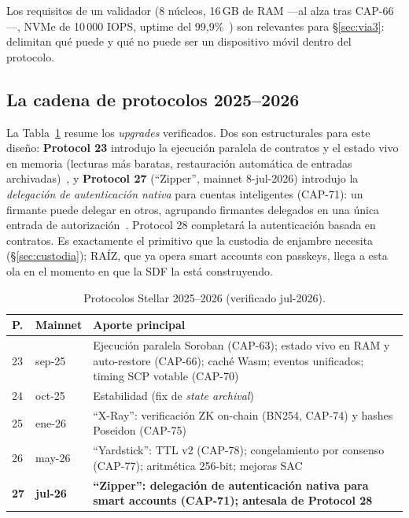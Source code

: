 \documentclass[twocolumn,10pt]{article}
\begin{document}
Los requisitos de un validador (8 n\'ucleos, 16\,GB de RAM ---al alza tras CAP-66---, NVMe de 10\,000 IOPS, uptime del 99{,}9\%~\cite{prereq}) son relevantes para \S\ref{sec:via3}: delimitan qu\'e puede y qu\'e no puede ser un dispositivo m\'ovil dentro del protocolo.

\subsection{La cadena de protocolos 2025--2026}

La Tabla~\ref{tab:protocolos} resume los \emph{upgrades} verificados. Dos son estructurales para este dise\~no: \textbf{Protocol 23} introdujo la ejecuci\'on paralela de contratos y el estado vivo en memoria (lecturas m\'as baratas, restauraci\'on autom\'atica de entradas archivadas)~\cite{p23}, y \textbf{Protocol 27} (``Zipper'', mainnet 8-jul-2026) introdujo la \emph{delegaci\'on de autenticaci\'on nativa} para cuentas inteligentes (CAP-71): un firmante puede delegar en otros, agrupando firmantes delegados en una \'unica entrada de autorizaci\'on~\cite{p27}. Protocol 28 completar\'a la autenticaci\'on basada en contratos. Es exactamente el primitivo que la custodia de enjambre necesita (\S\ref{sec:custodia}); RA\'IZ, que ya opera smart accounts con passkeys, llega a esta ola en el momento en que la SDF la est\'a construyendo.

\begin{table}[t]
\centering\small
\caption{Protocolos Stellar 2025--2026 (verificado jul-2026).}
\label{tab:protocolos}
\begin{tabularx}{\columnwidth}{@{}llX@{}}
\toprule
\textbf{P.} & \textbf{Mainnet} & \textbf{Aporte principal} \\
\midrule
23 & sep-25 & Ejecuci\'on paralela Soroban (CAP-63); estado vivo en RAM y auto-restore (CAP-66); cach\'e Wasm; eventos unificados; timing SCP votable (CAP-70)~\cite{p23} \\
24 & oct-25 & Estabilidad (fix de \emph{state archival})~\cite{p24} \\
25 & ene-26 & ``X-Ray'': verificaci\'on ZK on-chain (BN254, CAP-74) y hashes Poseidon (CAP-75)~\cite{p25} \\
26 & may-26 & ``Yardstick'': TTL v2 (CAP-78); congelamiento por consenso (CAP-77); aritm\'etica 256-bit; mejoras SAC~\cite{p26} \\
\textbf{27} & \textbf{jul-26} & \textbf{``Zipper'': delegaci\'on de autenticaci\'on nativa para smart accounts (CAP-71); antesala de Protocol 28}~\cite{p27} \\
\bottomrule
\end{tabularx}
\end{table}
\end{document}
